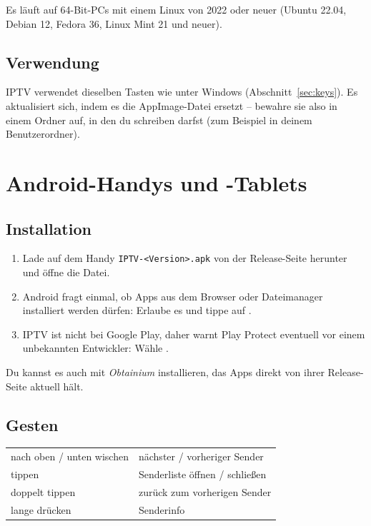 Es läuft auf 64-Bit-PCs mit einem Linux von 2022 oder neuer (Ubuntu 22.04,
Debian 12, Fedora 36, Linux Mint 21 und neuer).


\subsection{Verwendung}
IPTV verwendet dieselben Tasten wie unter Windows
(Abschnitt~\ref{sec:keys}). Es aktualisiert sich, indem es die AppImage-Datei
ersetzt -- bewahre sie also in einem Ordner auf, in den du schreiben darfst
(zum Beispiel in deinem Benutzerordner).

\section{Android-Handys und -Tablets}

\subsection{Installation}
\begin{enumerate}
  \item Lade auf dem Handy \texttt{IPTV-\textless Version\textgreater.apk}
        von der Release-Seite herunter und öffne die Datei.
  \item Android fragt einmal, ob Apps aus dem Browser oder Dateimanager
        installiert werden dürfen: Erlaube es und tippe auf
        .
  \item IPTV ist nicht bei Google Play, daher warnt Play Protect eventuell
        vor einem unbekannten Entwickler: Wähle .
\end{enumerate}
Du kannst es auch mit \emph{Obtainium} installieren, das Apps direkt von
ihrer Release-Seite aktuell hält.

\subsection{Gesten}
\begin{xltabular}{\linewidth}{@{}KX@{}}
nach oben / unten wischen & nächster / vorheriger Sender \\
tippen & Senderliste öffnen / schließen \\
doppelt tippen & zurück zum vorherigen Sender \\
lange drücken & Senderinfo \\
\bottomrule
\end{xltabular}

